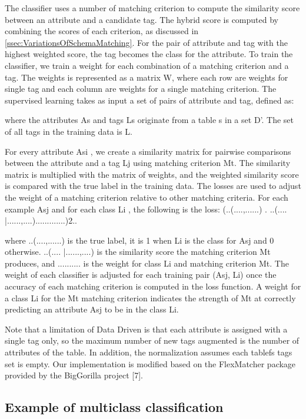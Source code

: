The classifier uses a number of matching criterion to compute the similarity score between an attribute and a candidate tag. The hybrid score is computed by combining the scores of each criterion, as discussed in \autoref{ssec:VariationsOfSchemaMatching}. For the pair of attribute and tag with the highest weighted score, the tag becomes the class for the attribute. To train the classifier, we train a weight for each combination of a matching criterion and a tag. The weights is represented as a matrix W, where each row are weights for single tag and each column are weights for a single matching criterion. The supervised learning takes as input a set of pairs of attribute and tag, defined as:

where the attributes As and tags Ls originate from a table s in a set D'. The set of all tags in the training data is L.

For every attribute Asi , we create a similarity matrix for pairwise comparisons between the attribute and a tag Lj using matching criterion Mt. The similarity matrix is multiplied with the matrix of weights, and the weighted similarity score is compared with the true label in the training data. The losses are used to adjust the weight of a matching criterion relative to other matching criteria. For each example Asj and for each class Li , the following is the loss: (..(....,......) . ..(.... |......,....).............)2..

where ..(....,......) is the true label, it is 1 when Li is the class for Asj and 0 otherwise. ..(.... |......,....) is the similarity score the matching criterion Mt produces, and .......... is the weight for class Li and matching criterion Mt. The weight of each classifier is adjusted for each training pair (Asj, Li) once the accuracy of each matching criterion is computed in the loss function. A weight for a class Li for the Mt matching criterion indicates the strength of Mt at correctly predicting an attribute Asj to be in the class Li.

Note that a limitation of Data Driven is that each attribute is assigned with a single tag only, so the maximum number of new tags augmented is the number of attributes of the table. In addition, the normalization assumes each tablefs tags set is empty. Our implementation is modified based on the FlexMatcher package provided by the BigGorilla project \cite{DBLP:journals/debu/ChenGHTD18}[7].

\subsection{Example of multiclass classification}

